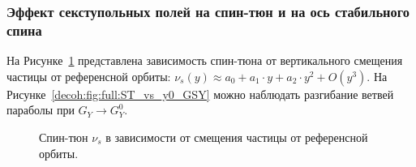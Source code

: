 \subsubsection{Эффект секступольных полей на спин-тюн и на ось стабильного спина}
На Рисунке~\ref{decoh:fig:ST_vs_y0_GSY} представлена зависимость спин-тюна от вертикального смещения частицы от референсной орбиты: $\nu_s(y) \approx a_0 + a_1\cdot y + a_2\cdot y^2 + O(y^3)$. На Рисунке~\ref{decoh:fig:full:ST_vs_y0_GSY} можно наблюдать разгибание ветвей параболы при $G_Y \rightarrow G_Y^0$.
\begin{figure}[h!]
	\centering
	\caption{Спин-тюн $\nu_s$ в зависимости от смещения частицы от референсной орбиты.\label{decoh:fig:ST_vs_y0_GSY}}
\end{figure}

